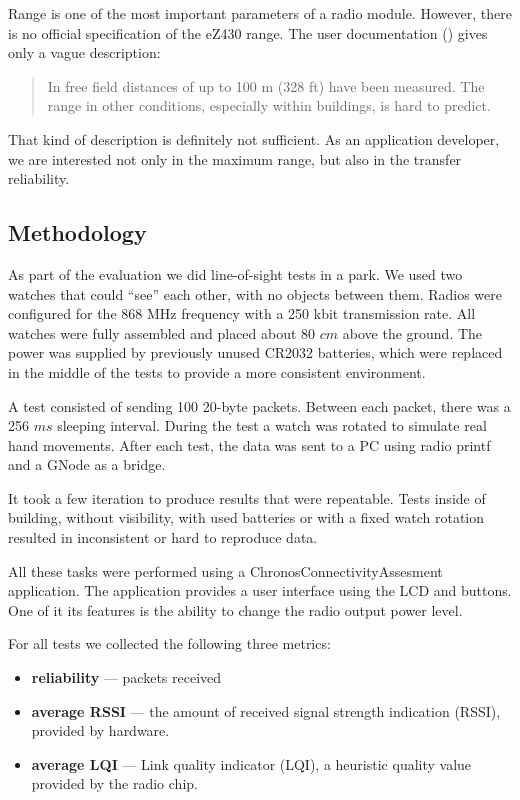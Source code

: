 Range is one of the most important parameters of a radio module.
However, there is no official specification of the eZ430 range.
The user documentation (\cite{eZ430Chronos}) gives only a vague description:
\begin{quote}
In free field distances of up to 100 m (328 ft) have been measured. The range in other conditions,
especially within buildings, is hard to predict.
\end{quote}

That kind of description is definitely not sufficient.
As an application developer, we are interested not only in the maximum range, but also in the transfer reliability.


\subsection{Methodology}

As part of the evaluation we did line-of-sight tests in a park.
We used two watches that could ``see'' each other, with no objects between them.
Radios were configured for the 868 MHz frequency with a 250 kbit transmission rate.
All watches were fully assembled and placed about 80 $ cm $ above the ground.
The power was supplied by previously unused CR2032 batteries, which were replaced in the middle of the tests to provide a more consistent environment.

A test consisted of sending 100 20-byte packets.
Between each packet, there was a 256 $ ms $ sleeping interval.
During the test a watch was rotated to simulate real hand movements.
After each test, the data was sent to a PC using radio printf and a GNode as a bridge.

It took a few iteration to produce results that were repeatable.
Tests inside of building, without visibility, with used batteries or with a fixed watch rotation resulted in inconsistent or hard to reproduce data.

All these tasks were performed using a ChronosConnectivityAssesment application.
The application provides a user interface using the LCD and buttons.
One of it its features is the ability to change the radio output power level.

For all tests we collected the following three metrics:
\begin{itemize}
  \item \textbf{reliability} --- packets received
  \item \textbf{average RSSI} --- the amount of received signal strength indication (RSSI), provided by hardware.
  \item \textbf{average LQI} --- Link quality indicator (LQI), a heuristic quality value provided by the radio chip.
\end{itemize}

